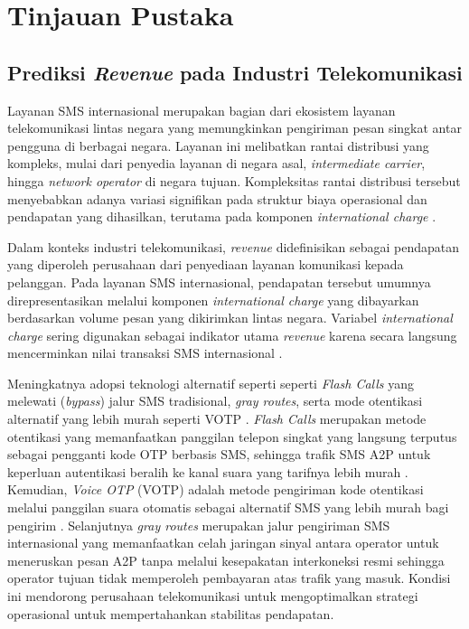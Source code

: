 \chapter{Tinjauan Pustaka}\label{ch:literature}

   \section{Prediksi \textit{Revenue} pada Industri Telekomunikasi}
\label{sec:revenuetelco}

    Layanan SMS internasional merupakan bagian dari ekosistem layanan telekomunikasi lintas negara yang memungkinkan pengiriman pesan singkat antar pengguna di berbagai negara. Layanan ini melibatkan rantai distribusi yang kompleks, mulai dari penyedia layanan di negara asal, \textit{intermediate carrier}, hingga \textit{network operator} di negara tujuan. Kompleksitas rantai distribusi tersebut menyebabkan adanya variasi signifikan pada struktur biaya operasional dan pendapatan yang dihasilkan, terutama pada komponen \textit{international charge} \cite{Truong2021TelecomRevenue}.
    
    Dalam konteks industri telekomunikasi, \textit{revenue} didefinisikan sebagai pendapatan yang diperoleh perusahaan dari penyediaan layanan komunikasi kepada pelanggan. Pada layanan SMS internasional, pendapatan tersebut umumnya direpresentasikan melalui komponen \textit{international 
    charge} yang dibayarkan berdasarkan volume pesan yang dikirimkan lintas negara. Variabel \textit{international charge} sering digunakan sebagai indikator utama \textit{revenue} karena secara langsung mencerminkan nilai transaksi SMS internasional \cite{Truong2021TelecomRevenue}.
    
    Meningkatnya adopsi teknologi alternatif seperti seperti \textit{Flash Calls} yang melewati (\textit{bypass}) jalur SMS tradisional, \textit{gray routes}, serta mode otentikasi alternatif yang lebih murah seperti VOTP \cite{telin2026leakage}. \textit{Flash Calls} merupakan metode otentikasi yang memanfaatkan panggilan telepon singkat yang langsung terputus sebagai pengganti kode OTP berbasis SMS, sehingga trafik SMS A2P untuk keperluan autentikasi beralih ke kanal suara yang tarifnya lebih murah \cite{telin2026leakage}. Kemudian, \textit{Voice OTP} (VOTP) adalah metode pengiriman kode otentikasi melalui panggilan suara otomatis sebagai alternatif SMS yang lebih murah bagi pengirim \cite{telin2026leakage}. Selanjutnya \textit{gray routes} merupakan jalur pengiriman SMS internasional yang memanfaatkan celah jaringan sinyal antara operator untuk meneruskan pesan A2P tanpa melalui kesepakatan interkoneksi resmi sehingga operator tujuan tidak memperoleh pembayaran atas trafik yang masuk. Kondisi ini mendorong perusahaan telekomunikasi untuk mengoptimalkan strategi operasional untuk mempertahankan stabilitas pendapatan.
    
